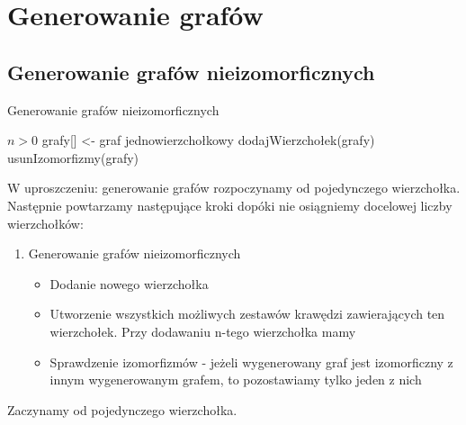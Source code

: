 \documentclass[11pt]{article}
\begin{document}
  
\section{Generowanie grafów}

\subsection{Generowanie grafów nieizomorficznych} 

\begin{algorithm}
  \caption{Generowanie grafów nieizomorficznych}
  \begin{algorithmic}
  \REQUIRE $n > 0 $
  \STATE grafy[] <- graf jednowierzchołkowy 
    \STATE dodajWierzchołek(grafy)
    \STATE usunIzomorfizmy(grafy)
  \ENDWHILE
  \end{algorithmic}
\end{algorithm}

W uproszczeniu: generowanie grafów rozpoczynamy od pojedynczego wierzchołka.
Następnie powtarzamy następujące kroki dopóki nie osiągniemy docelowej liczby wierzchołków:
\begin{enumerate}
 \item Generowanie grafów nieizomorficznych 

 \begin{itemize}
 \item  Dodanie nowego wierzchołka  

 \item Utworzenie wszystkich możliwych zestawów krawędzi zawierających ten wierzchołek. Przy dodawaniu n-tego wierzchołka mamy 

 \item Sprawdzenie izomorfizmów - jeżeli wygenerowany graf jest izomorficzny z innym wygenerowanym grafem, to pozostawiamy tylko jeden z nich 
 
 \end{itemize}
\end{enumerate}

Zaczynamy od pojedynczego wierzchołka.

\begin{figure}[H]
  \centering
   \caption{}
\end{figure}

\begin{figure}[h]
  \centering
   \caption{}
\end{figure}
\end{document}
